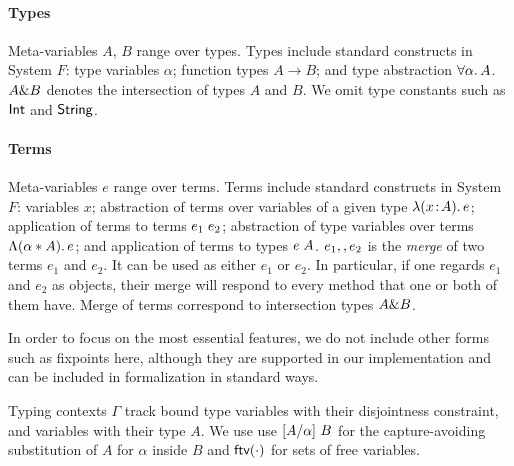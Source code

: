 
\paragraph{Types} Meta-variables $A$, $B$ range over types. Types include
standard constructs in System $F$: type variables $\alpha$; function types $A
\to B$; and type abstraction $\forall \alpha.\, A$. $A \& B$ denotes the
intersection of types $A$ and $B$. We omit type constants such as $\textsf{Int}$ and
$\textsf{String}$.

\paragraph{Terms} Meta-variables $e$ range over terms.  Terms include standard
constructs in System $F$: variables $x$; abstraction of terms over variables of
a given type $\lambda (x \!:\! A).\, e$; application of terms to terms $e_1 \; e_2$;
abstraction of type variables over terms $\Lambda (\alpha * A).\, e$;  and
application of terms to types $e \; A$.  $e_1 ,, e_2$ is the
\emph{merge} of two terms $e_1$ and $e_2$. It can be used as either $ e_1 $ or $
e_2 $. In particular, if one regards $e_1$ and $e_2$ as objects, their merge
will respond to every method that one or both of them have. Merge of terms
correspond to intersection types $A \& B$.


In order to focus on the most essential features, we do not include other forms
such as fixpoints here, although they are supported in our implementation and
can be included in formalization in standard ways.

Typing contexts $ \Gamma $ track bound type variables with their disjointness
constraint, and variables with their type $A$. We use use $\lbrack A / \alpha \rbrack~
{B}$ for the capture-avoiding substitution of $A$ for $\alpha$ inside $B$ and
$\textsf{ftv}(\cdot)$ for sets of free variables.


